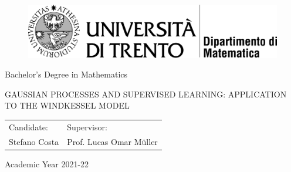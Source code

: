 

\begin{figure}[H]
\centering
\includegraphics{images/dmtesi.png}
\end{figure}

\setlength{\parskip}{-12pt} %
\begin{center}
\vspace{0.5cm}
\Large Bachelor's Degree in Mathematics
\end{center}

\vspace{5 cm} %


\begin{center}
{\fontsize{20}{30} \selectfont GAUSSIAN PROCESSES AND SUPERVISED LEARNING: APPLICATION TO THE WINDKESSEL MODEL \par} %
\end{center}


\vspace{6 cm} %


\begin{large}
\begin{tabular}{m{7cm}l}
Candidate: & Supervisor:\\
Stefano Costa & Prof. Lucas Omar Müller
\end{tabular}
\end{large}


\vfill %

\setlength{\parskip}{-18pt} %
\begin{center}
{Academic Year 2021-22}
\end{center}
\setlength{\parskip}{0pt} %